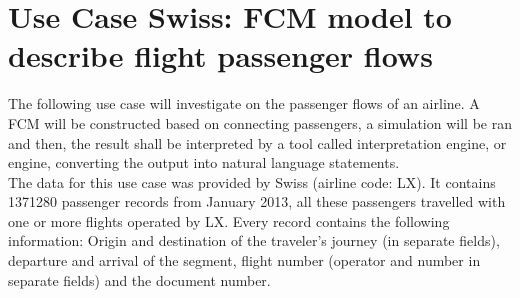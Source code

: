 \documentclass[conference]{IEEEtran}
\begin{document}
\section{Use Case Swiss: FCM model to describe flight passenger flows}
The following use case will investigate on the passenger flows of an airline. A FCM will be constructed based on connecting passengers, a simulation will be ran and then, the result shall be interpreted by a tool called interpretation engine, or engine, converting the output into natural language statements.\\
The data for this use case was provided by Swiss (airline code: LX). It contains 1371280 passenger records from January 2013, all these passengers travelled with one or more flights operated by LX. Every record contains the following information: Origin and destination of the traveler's journey (in separate fields), departure and arrival of the segment, flight number (operator and number in separate fields) and the document number.\\
\end{document}
